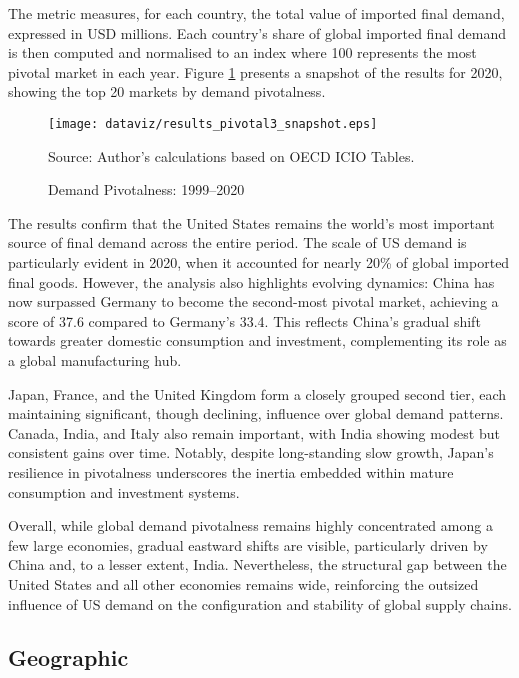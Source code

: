 \documentclass[11pt]{article}
\begin{document}
The metric measures, for each country, the total value of imported final demand, expressed in USD millions. Each country’s share of global imported final demand is then computed and normalised to an index where 100 represents the most pivotal market in each year. Figure \ref{fig:pivotal_demand} presents a snapshot of the results for 2020, showing the top 20 markets by demand pivotalness.

\begin{figure}[H]
	\caption{Demand Pivotalness: 1999–2020}
	\label{fig:pivotal_demand}
	\centering
        \phantom{a}
	\texttt{[image: dataviz/results\_pivotal3\_snapshot.eps]}

	{\footnotesize Source: Author's calculations based on OECD ICIO Tables.}
\end{figure}


The results confirm that the United States remains the world's most important source of final demand across the entire period. The scale of US demand is particularly evident in 2020, when it accounted for nearly 20\% of global imported final goods. However, the analysis also highlights evolving dynamics: China has now surpassed Germany to become the second-most pivotal market, achieving a score of 37.6 compared to Germany’s 33.4. This reflects China’s gradual shift towards greater domestic consumption and investment, complementing its role as a global manufacturing hub.

Japan, France, and the United Kingdom form a closely grouped second tier, each maintaining significant, though declining, influence over global demand patterns. Canada, India, and Italy also remain important, with India showing modest but consistent gains over time. Notably, despite long-standing slow growth, Japan’s resilience in pivotalness underscores the inertia embedded within mature consumption and investment systems.

Overall, while global demand pivotalness remains highly concentrated among a few large economies, gradual eastward shifts are visible, particularly driven by China and, to a lesser extent, India. Nevertheless, the structural gap between the United States and all other economies remains wide, reinforcing the outsized influence of US demand on the configuration and stability of global supply chains.

\subsection{Geographic}
\end{document}
